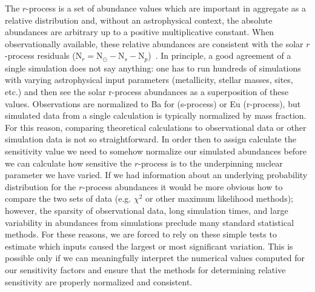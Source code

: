 \documentclass[aps,prc,reprint,showpacs,floatfix,nofootinbib]{revtex4-1}
\begin{document}
The $r$-process is a set of abundance values which are important in aggregate as a relative distribution and,  
without an astrophysical context, the absolute abundances are arbitrary up to a positive multiplicative constant.
When observationally available, these relative abundances are consistent with the solar $r$-process residuals 
($\textrm{N}_r = \textrm{N}_\odot - \textrm{N}_s - \textrm{N}_p$)~\cite{doi:10.1146/annurev.astro.46.060407.145207}.
In principle, a good agreement of a single simulation does not say anything: one has to run hundreds of simulations with varying astrophysical input
parameters (metallicity, stellar masses, sites, etc.) and then see the solar r-process abundances as a superposition of these values.
Observations are normalized to Ba for (s-process) or Eu (r-process), but simulated data from a single calculation is typically 
normalized by mass fraction. 
For this reason, comparing theoretical calculations to observational data or other simulation data is not so straightforward. 
In order then to assign calculate the sensitivity value
we need to somehow normalize our simulated abundances before we can calculate how sensitive the $r$-process is to
the underpinning nuclear parameter we have varied. If we had information about 
an underlying probability distribution for the $r$-process abundances it would be more obvious how to 
compare the two sets of data (e.g. $\chi^2$ or other maximum likelihood methods); however, the sparsity 
of observational data, long simulation times, and large variability 
in abundances from simulations preclude many standard statistical methods. 
For these reasons, we are forced to rely on these simple tests to estimate which inputs caused the 
largest or most significant variation.
This is possible only if we can meaningfully interpret the numerical 
values computed for our sensitivity factors and ensure that the 
methods for determining relative sensitivity are properly normalized and consistent.  
\end{document}
